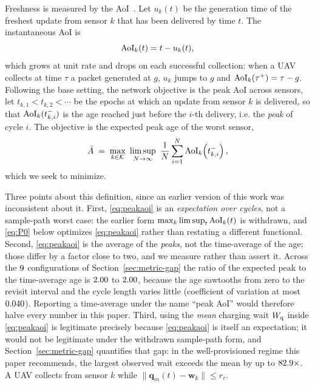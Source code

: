 Freshness is measured by the AoI~\cite{kaul2012aoi}. Let
$u_k(t)$ be the generation time of the freshest update from sensor $k$ that has
been delivered by time $t$. The instantaneous AoI is
\begin{equation}
  \mathrm{AoI}_k(t) = t - u_k(t),
  \label{eq:aoi}
\end{equation}
which grows at unit rate and drops on each successful collection: when a UAV
collects at time $\tau$ a packet generated at $g$, $u_k$ jumps to $g$ and
$\mathrm{AoI}_k(\tau^{+})=\tau-g$. Following the base setting, the network objective is
the peak AoI across sensors,
let $t_{k,1}<t_{k,2}<\cdots$ be the epochs at which an update from sensor $k$ is
delivered, so that $\mathrm{AoI}_k(t_{k,i}^-)$ is the age reached just before the $i$-th
delivery, i.e. the \emph{peak} of cycle $i$. The objective is the expected peak age of
the worst sensor,
\begin{equation}
  \bar{A} \;=\; \max_{k\in\mathcal{K}}\ \limsup_{N\to\infty}\
  \frac{1}{N}\sum_{i=1}^{N}\Aoi_k\!\left(t_{k,i}^{-}\right),
  \label{eq:peakaoi}
\end{equation}
which we seek to minimize.

Three points about this definition, since an earlier version of this work was
inconsistent about it. First, \eqref{eq:peakaoi} is an \emph{expectation over cycles},
not a sample-path worst case: the earlier form $\max_k\limsup_t \mathrm{AoI}_k(t)$ is withdrawn,
and \eqref{eq:P0} below optimizes \eqref{eq:peakaoi} rather than restating a different
functional. Second, \eqref{eq:peakaoi} is the average of the \emph{peaks}, not the
time-average of the age; those differ by a factor close to two, and we measure rather
than assert it. Across the $9$ configurations of
Section~\ref{sec:metric-gap} the ratio of the expected peak to the time-average age
is $2.00$ to $2.00$, because the age sawtooths from zero to the
revisit interval and the cycle length varies little (coefficient of variation at most
$0.040$). Reporting a time-average under the name ``peak AoI'' would therefore
halve every number in this paper. Third, using the \emph{mean} charging wait $W_{\mathrm q}$
inside \eqref{eq:peakaoi} is legitimate precisely because \eqref{eq:peakaoi} is itself
an expectation; it would not be legitimate under the withdrawn sample-path form, and
Section~\ref{sec:metric-gap} quantifies that gap: in the well-provisioned regime this
paper recommends, the largest observed wait exceeds the mean by up to $82.9\times$. A UAV collects from sensor $k$ while
$\|\mathbf{q}_m(t)-\mathbf{w}_k\|\le r_c$.

